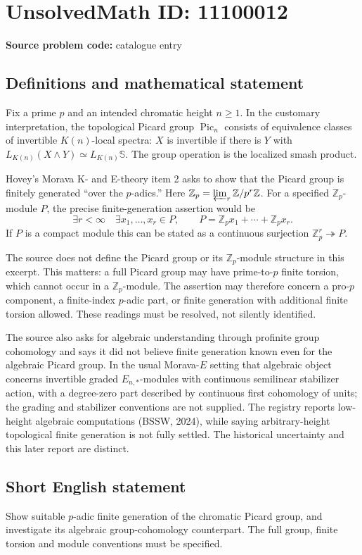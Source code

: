 \documentclass[11pt]{article}
\newcommand{\Z}{\mathbb{Z}}
\begin{document}
\section*{UnsolvedMath ID: 11100012}
\textbf{Source problem code:} catalogue entry
\subsection{Definitions and mathematical statement}
Fix a prime $p$ and an intended chromatic height $n\geq1$. In the customary interpretation, the topological Picard group $\operatorname{Pic}_n$ consists of equivalence classes of invertible $K(n)$-local spectra: $X$ is invertible if there is $Y$ with $L_{K(n)}(X\wedge Y)\simeq L_{K(n)}\mathbb S$. The group operation is the localized smash product.

Hovey's Morava K- and E-theory item 2 asks to show that the Picard group is finitely generated ``over the $p$-adics.'' Here $\Z_p=\varprojlim_r\Z/p^r\Z$. For a specified $\Z_p$-module $P$, the precise finite-generation assertion would be
\[
 \exists r<\infty\quad\exists x_1,\ldots,x_r\in P,
 \qquad P=\Z_p x_1+\cdots+\Z_p x_r.
\]
If $P$ is a compact module this can be stated as a continuous surjection $\Z_p^r\twoheadrightarrow P$.

The source does not define the Picard group or its $\Z_p$-module structure in this excerpt. This matters: a full Picard group may have prime-to-$p$ finite torsion, which cannot occur in a $\Z_p$-module. The assertion may therefore concern a pro-$p$ component, a finite-index $p$-adic part, or finite generation with additional finite torsion allowed. These readings must be resolved, not silently identified.

The source also asks for algebraic understanding through profinite group cohomology and says it did not believe finite generation known even for the algebraic Picard group. In the usual Morava-$E$ setting that algebraic object concerns invertible graded $E_{n,*}$-modules with continuous semilinear stabilizer action, with a degree-zero part described by continuous first cohomology of units; the grading and stabilizer conventions are not supplied. The registry reports low-height algebraic computations (BSSW, 2024), while saying arbitrary-height topological finite generation is not fully settled. The historical uncertainty and this later report are distinct.
\subsection{Short English statement}
Show suitable $p$-adic finite generation of the chromatic Picard group, and investigate its algebraic group-cohomology counterpart. The full group, finite torsion and module conventions must be specified.
\end{document}
